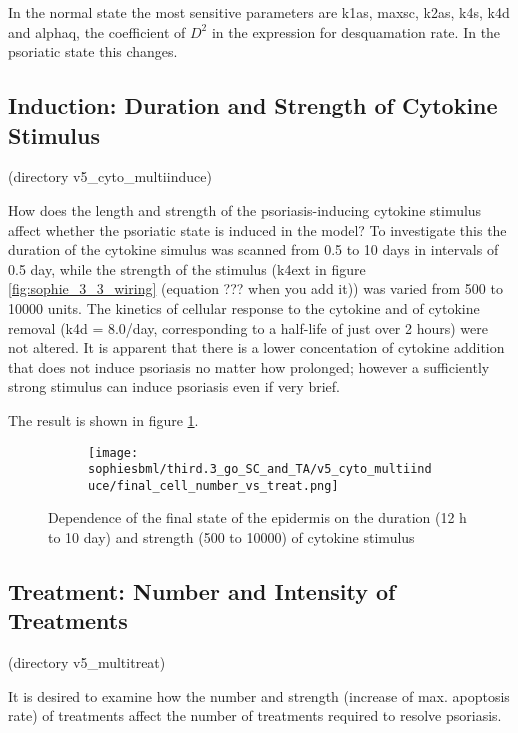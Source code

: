 \documentclass[a4paper,10pt]{report}
\newcommand{\psortbase}{/home/ngrs2/work/bsu/PSORT_Zuliani_Reynolds/}
\newcommand{\sbmlbase}{\psortbase/sbml-sh/}
\newcommand{\sophiesbml}{\sbmlbase/sophie_like}
\begin{document}
In the normal state the most sensitive parameters are k1as, maxsc, k2as, k4s, k4d and alphaq, the coefficient of $D^2$ in the expression for desquamation rate. In the psoriatic state this changes.


\subsection{Induction: Duration and Strength of Cytokine Stimulus}

(directory v5\_cyto\_multiinduce)

How does the length and strength of the psoriasis-inducing cytokine stimulus affect whether the psoriatic state is induced in the model? 
To investigate this the duration of the cytokine simulus was scanned from 0.5 to 10 days in intervals of 0.5 day, while the strength of the stimulus (k4ext in figure \ref{fig:sophie_3_3_wiring} (equation ??? when you add it)) was varied from 500 to 10000 units. The kinetics of cellular response to the cytokine and of cytokine removal (k4d = 8.0/day, corresponding to a half-life of just over 2 hours) were not altered. It is apparent that there is a lower concentation of cytokine addition that does not induce psoriasis no matter how prolonged; however a sufficiently strong stimulus can induce psoriasis even if very brief.

The result is shown in figure \ref{fig:thirdpoint3sophie_scan_induce}.

\begin{figure}[h!]
  \begin{subfigure}{\textwidth}
    \centering
    \texttt{[image: \\sophiesbml/third.3\_go\_SC\_and\_TA/v5\_cyto\_multiinduce/final\_cell\_number\_vs\_treat.png]}
  \end{subfigure}
  \caption{Dependence of the final state of the epidermis on the duration (12 h to 10 day) and strength (500 to 10000) of cytokine stimulus}
  \label{fig:thirdpoint3sophie_scan_induce}
\end{figure}



\subsection{Treatment: Number and Intensity of Treatments}

(directory v5\_multitreat)

It is desired to examine how the number and strength (increase of max.
apoptosis rate) of treatments affect the number of treatments required to resolve psoriasis.
\end{document}
